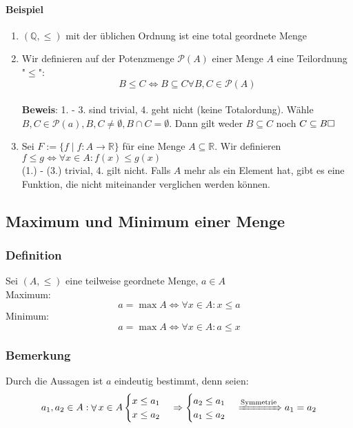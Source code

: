 \documentclass[a4paper]{scrartcl}
\DeclareMathOperator{\Forall}{\forall}%
\begin{document}
\paragraph{Beispiel}
\label{sec-2-6-1-1}
\begin{enumerate}
\item $(\mathbb{Q},\leq)$ mit der üblichen Ordnung ist eine total geordnete Menge
\item Wir definieren auf der Potenzmenge $\mathcal{P}(A)$ einer Menge $A$ eine Teilordnung "$\leq$": \[B\leq C \Leftrightarrow B \subseteq C\Forall B,C\in \mathcal{P}(A)\] \\
        \textbf{Beweis}: 1. - 3. sind trivial, 4. geht nicht (keine Totalordung). Wähle $B,C\in \mathcal{P}(a), B,C\neq \emptyset, B\cap C = \emptyset$. Dann gilt weder $B\subseteq C$ noch $C\subseteq B\hfill\square$
\item Sei $F:=\{f\mid f:A\to\mathbb{R}\}$ für eine Menge $A\subseteq \mathbb{R}$. Wir definieren $f\leq g \Leftrightarrow \Forall x\in A: f(x) \leq g(x)$ \\
        (1.) - (3.) trivial, 4. gilt nicht. Falls $A$ mehr als ein Element hat, gibt es eine Funktion, die nicht miteinander verglichen werden können.
\end{enumerate}
\subsection{Maximum und Minimum einer Menge}
\label{sec-2-7}
\subsubsection{Definition}
\label{sec-2-7-1}
Sei $(A,\leq)$ eine teilweise geordnete Menge, $a\in A$ \\
    Maximum:
\[a = \max A \Leftrightarrow \Forall x\in A: x\leq a\]
Minimum:
\[a = \max A \Leftrightarrow \Forall x\in A: a\leq x\]
\subsubsection{Bemerkung}
\label{sec-2-7-2}
Durch die Aussagen ist $a$ eindeutig bestimmt, denn seien:
\[a_1,a_2\in A:\Forall x\in A \begin{cases}x\leq a_1 \\ x\leq a_2 \end{cases} \Rightarrow \begin{cases} a_2 \leq a_1 \\ a_1 \leq a_2 \end{cases} \xRightarrow{\text{Symmetrie}} a_1 = a_2 \]
\end{document}
